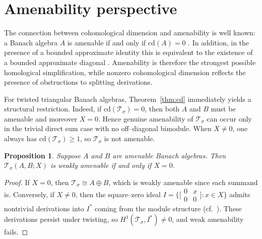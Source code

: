 \documentclass{article}
\theoremstyle{plain}
\newtheorem{prop}[theorem]{Proposition}
\theoremstyle{definition}
\newcommand{\T}{\mathcal{T}}
\begin{document}
\section{Amenability perspective}

The connection between cohomological dimension and amenability is well known:
a Banach algebra $A$ is amenable if and only if $\mathrm{cd}(A)=0$
\cite[Thm.~2.5]{JohnsonMemoir}.
In addition, in the presence of a bounded approximate identity this is
equivalent to the existence of a bounded approximate diagonal \cite{JohnsonAJM}.
Amenability is therefore the strongest possible homological simplification,
while nonzero cohomological dimension reflects the presence of obstructions
to splitting derivations.

For twisted triangular Banach algebras, Theorem~\ref{thm:cd}
immediately yields a structural restriction.
Indeed, if $\mathrm{cd}(\T_\sigma)=0$, then both $A$ and $B$ must be amenable
and moreover $X=0$.
Hence genuine amenability of $\T_\sigma$ can occur only in the trivial
direct sum case with no off--diagonal bimodule.
When $X\neq 0$, one always has $\mathrm{cd}(\T_\sigma)\ge 1$,
so $\T_\sigma$ is not amenable.

\begin{prop}\label{prop:weak-amen}
Suppose $A$ and $B$ are amenable Banach algebras.
Then $\T_\sigma(A,B;X)$ is weakly amenable if and only if $X=0$.
\end{prop}

\begin{proof}
If $X=0$, then $\T_\sigma\cong A\oplus B$, which is weakly amenable
since each summand is.
Conversely, if $X\neq 0$, then the square--zero ideal
$I=\{\bigl[\begin{smallmatrix}0&x\\0&0\end{smallmatrix}\bigr]:x\in X\}$
admits nontrivial derivations into $I^*$ coming from the module structure
(cf.\ \cite{ForrestMarcouxWA}).
These derivations persist under twisting, so $H^1(\T_\sigma,I^*)\neq 0$,
and weak amenability fails.
\end{proof}
\end{document}
